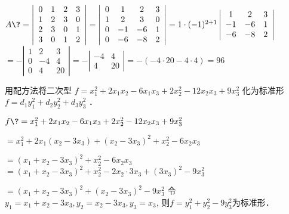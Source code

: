 \documentclass{jnuexam}
\begin{document}
\begin{solution}
  $A \? = \left|\begin{array}{cccc}
      0 & 1 & 2 & 3 \\
      1 & 2 & 3 & 0 \\
      2 & 3 & 0 & 1 \\
      3 & 0 & 1 & 2
    \end{array}\right| = \left|\begin{array}{cccc}
      0 & 1   & 2   & 3 \\
      1 & 2   & 3   & 0 \\
      0 & - 1 & - 6 & 1 \\
      0 & - 6 & - 8 & 2
    \end{array}\right| = 1 \cdot (- 1)^{2 + 1} \left|\begin{array}{ccc}
      1   & 2   & 3 \\
      - 1 & - 6 & 1 \\
      - 6 & - 8 & 2
    \end{array}\right|$ 
  \+ $= -\left|\begin{array}{ccc}
      1 & 2   & 3  \\
      0 & - 4 & 4  \\
      0 & 4   & 20
    \end{array}\right| = - \left|\begin{array}{cc}
      - 4 & 4  \\
      4   & 20
    \end{array}\right| = -(-4\cdot20-4\cdot4) = 96$ 
\end{solution}

\vfill

\begin{problem}
用配方法将二次型 $f = x_1^2 + 2 x_1 x_2 - 6 x_1 x_3 + 2 x_2^2 - 12
  x_2 x_3 + 9 x^2_3$ 化为标准形 $f = d_1 y^2_1 + d_2 y^2_2 + d_3 y^2_3$ ．
\end{problem}

\bigskip

\begin{solution}
  $f \? = x_1^2 + 2 x_1 x_2 - 6 x_1 x_3 + 2 x_2^2 - 12 x_2 x_3 + 9 x^2_3$ \par
  \+ $= x_1^2 + 2 x_1 (x_2 - 3 x_3) + (x_2 - 3 x_3)^2 + x_2^2 - 6 x_2 x_3 $ \par
  \+ $= (x_1 + x_2 - 3 x_3)^2 + x_2^2 - 6 x_2 x_3$ 
  \+ $= (x_1 + x_2 - 3 x_3)^2 + x_2^2 - 2 x_2 \cdot 3 x_3 + (3 x_3)^2 - 9x_3^2$ \par
  \+ $= (x_1 + x_2 - 3 x_3)^2 + (x_2 - 3 x_3)^2 - 9 x_3^2$ 
  令$y_1 = x_1 + x_2 - 3 x_3, y_2 = x_2 - 3 x_3, y_3 = x_3$, \newline
  则$f = y_1^2 + y_2^2 - 9y_3^2$为标准形．
\end{solution}
\end{document}
